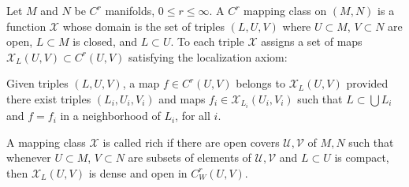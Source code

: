 Let $M$ and $N$ be $C^r$ manifolds, $0 \leqslant r \leqslant \infty$. A $C^r$ mapping class on $(M,N)$ is a function $\mathcal{X}$ whose domain is the set of triples $(L,U,V)$ where $U \subset M$, $V \subset N$ are open, $L \subset M$ is closed, and $L \subset U$. To each triple $\mathcal{X}$ assigns a set of maps $\mathcal{X}_L(U,V) \subset C^r(U,V)$ satisfying the localization axiom:

Given triples $(L,U,V)$, a map $f \in C^r(U,V)$ belongs to $\mathcal{X}_L(U,V)$ provided there exist triples $(L_i,U_i,V_i)$ and maps $f_i \in \mathcal{X}_{L_i}(U_i,V_i)$ such that $L \subset \bigcup L_i$ and $f = f_i$ in a neighborhood of $L_i$, for all $i$.

A mapping class $\mathcal{X}$ is called rich if there are open covers $\mathcal{U}, \mathcal{V}$ of $M, N$ such that whenever $U \subset M$, $V \subset N$ are subsets of elements of $\mathcal{U}, \mathcal{V}$ and $L \subset U$ is compact, then $\mathcal{X}_L(U,V)$ is dense and open in $C^r_W(U,V)$.
